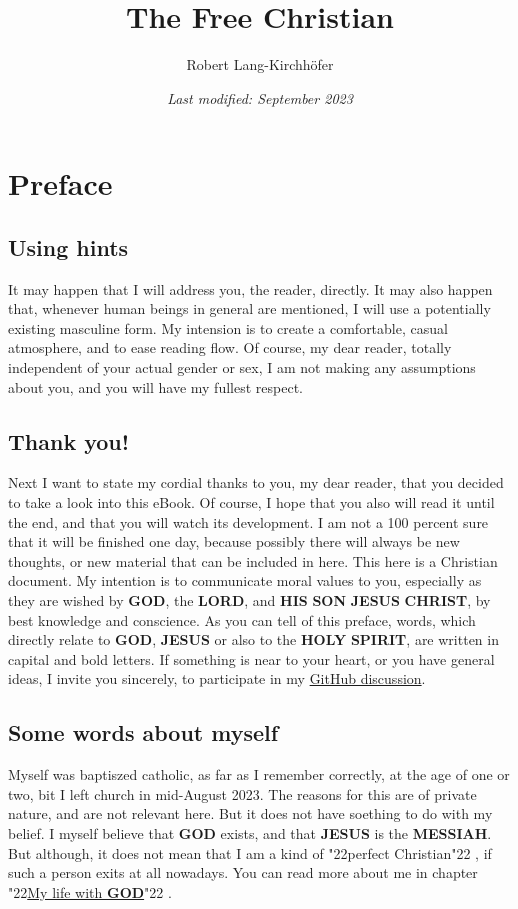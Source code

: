 \documentclass[12pt,a4paper]{article}
\title{\textbf{The Free Christian}}
\author{Robert Lang-Kirchh\"ofer}
\date{\textit{Last modified: September 2023}}
\newcommand{\Christ}[0]{\textbf{CHRIST}}
\newcommand{\God}[0]{\textbf{GOD}}
\newcommand{\His}[0]{\textbf{HIS}}
\newcommand{\Holy}[0]{\textbf{HOLY}}
\newcommand{\Jesus}[0]{\textbf{JESUS}}
\newcommand{\Lord}[0]{\textbf{LORD}}
\newcommand{\Messiah}[0]{\textbf{MESSIAH}}
\newcommand{\Son}[0]{\textbf{SON}}
\newcommand{\Spirit}[0]{\textbf{SPIRIT}}
\newcommand{\q}[1]{\char"22{#1}\char"22 }
\begin{document}
	\setlength{\parindent}{0mm}
	\maketitle
	\newpage

	\tableofcontents
	\newpage
	
	\section{Preface}

	\subsection{Using hints}
		It may happen that I will address you,
		the reader,
		directly.
		It may also happen that,
		whenever human beings in general are mentioned,
		I will use a potentially existing masculine form.
		My intension is to create a comfortable,
		casual atmosphere,
		and to ease reading flow.
		Of course,
		my dear reader,
		totally independent of your actual gender or sex,
		I am not making any assumptions about you,
		and you will have my fullest respect.
		
	\subsection{Thank you!}
		Next I want to state my cordial thanks to you,
		my dear reader,
		that you decided to take a look into this eBook.
		Of course,
		I hope that you also will read it until the end,
		and that you will watch its development.
		I am not a 100 percent sure that it will be finished one day,
		because possibly there will always be new thoughts,
		or new material that can be included in here.
		This here is a Christian document.
		My intention is to communicate moral values to you,
		especially as they are wished by {\God}, the {\Lord},
		and {\His} {\Son} {\Jesus} {\Christ},
		by best knowledge and conscience.
		As you can tell of this preface,
		words,
		which directly relate to {\God},
		{\Jesus} or also to the {\Holy} {\Spirit},
		are written in capital and bold letters.
		If something is near to your heart,
		or you have general ideas,
		I invite you sincerely,
		to participate in my  \href{https://github.com/DerRobert-28/Der-Freie-Christ/discussions}{GitHub discussion}.
	
	\subsection{Some words about myself}
		Myself was baptiszed catholic,
		as far as I remember correctly,
		at the age of one or two,
		bit I left church in mid-August 2023.
		The reasons for this are of private nature,
		and are not relevant here.
		But it does not have soething to do with my belief.
		I myself believe that {\God} exists,
		and that {\Jesus} is the {\Messiah}.
		But although,
		it does not mean that I am a kind of \q{perfect Christian},
		if such a person exits at all nowadays.
		You can read more about me in chapter \q{\hyperref[MeinLebenMitGott]{My life with {\God}}}.
\end{document}
